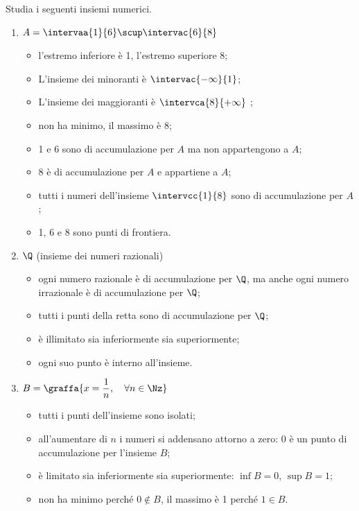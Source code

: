 \begin{esempio}
Studia i seguenti insiemi numerici.
\begin{enumerate} [label=\alph*)]
\item \(A = \intervaa{1}{6} \scup \intervac{6}{8}\)
\begin{itemize} [noitemsep]
\item l'estremo inferiore è 1, l'estremo superiore 8;
\item L'insieme dei minoranti è \(\intervac{-\infty}{1}\);
\item L'insieme dei maggioranti è \(\intervca{8}{+\infty}\) ;
\item non ha minimo, il massimo è 8;
\item 1 e 6 sono di accumulazione per \(A\) ma non appartengono a \(A\);
\item 8 è di accumulazione per \(A\) e appartiene a \(A\);
\item tutti i numeri dell'insieme \(\intervcc{1}{8}\)  sono di 
accumulazione per \(A\);
\item 1, 6 e 8 sono punti di frontiera.
\end{itemize}
\item \(\Q\) (insieme dei numeri razionali)
\begin{itemize} [noitemsep]
\item ogni numero razionale è di accumulazione per \(\Q\), 
ma anche ogni numero irrazionale è di accumulazione per \(\Q\);
\item tutti i punti della retta sono di accumulazione per \(\Q\); 
\item è illimitato sia inferiormente sia superiormente;
\item ogni suo punto è interno all'insieme.
\end{itemize}
\item \(B=\graffa{x = \dfrac{1}{n}, \quad \forall n \in \Nz}\)
\begin{itemize} [noitemsep]
\item tutti i punti dell'insieme sono isolati;
\item all'aumentare di \(n\) i numeri si addensano attorno a zero: 0 è un 
punto di accumulazione per l'insieme \(B\); 
\item è limitato sia inferiormente sia superiormente: 
\(\inf{B} = 0\), \(\sup{B} = 1\);
\item non ha minimo perché \(0 \notin B\), il massimo è 1 perché \(1 \in B\).
\end{itemize}
\end{enumerate}
\end{esempio}









